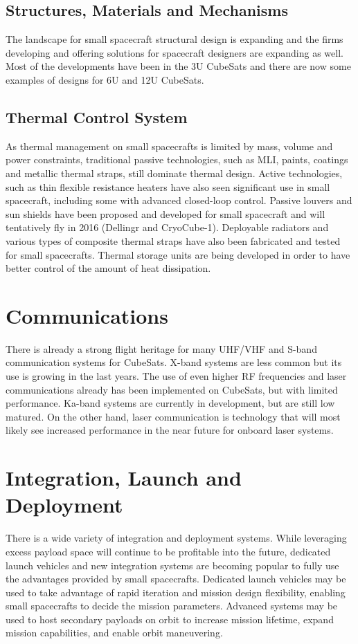 \subsection*{Structures, Materials and Mechanisms}
The landscape for small spacecraft structural design is expanding and the firms developing and offering solutions for spacecraft designers are expanding as well. Most of the developments have been in the 3U CubeSats and there are now some examples of designs for 6U and 12U CubeSats.
\subsection*{Thermal Control System}
As thermal management on small spacecrafts is limited by mass, volume and power constraints, traditional passive technologies, such as MLI, paints, coatings and metallic thermal straps, still dominate thermal design. Active technologies, such as thin flexible resistance heaters have also seen significant use in small spacecraft, including some with advanced closed-loop control. Passive louvers and sun shields have been proposed and developed for small spacecraft and will tentatively fly in 2016 (Dellingr and CryoCube-1). Deployable radiators and various types of composite thermal straps have also been fabricated and tested for small spacecrafts. Thermal storage units are being developed in order to have better control of the amount of heat dissipation.

\section*{Communications}
There is already a strong flight heritage for many UHF/VHF and S-band communication systems for CubeSats. X-band systems are less common but its use is growing in the last years. The use of even higher RF frequencies and laser communications already has been implemented on CubeSats, but with limited performance. Ka-band systems are currently in development, but are still low matured. On the other hand, laser communication is technology that will most likely see increased performance in the near future for onboard laser systems.

\section*{Integration, Launch and Deployment}
There is a wide variety of integration and deployment systems. While leveraging excess payload space will continue to be profitable into the future, dedicated launch vehicles and new integration systems are becoming popular to fully use the advantages provided by small spacecrafts. Dedicated launch vehicles may be used to take advantage of rapid iteration and mission design flexibility, enabling small spacecrafts to decide the mission parameters. Advanced systems may be used to host secondary payloads on orbit to increase mission lifetime, expand mission capabilities, and enable orbit maneuvering.

